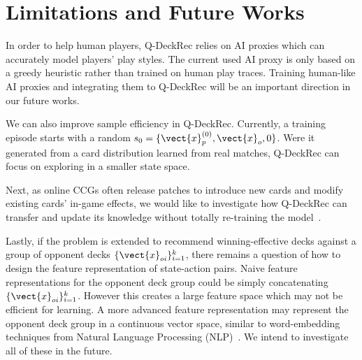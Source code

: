 \section{Limitations and Future Works}\label{sec:limitations}
In order to help human players, Q-DeckRec relies on AI proxies which can accurately model players' play styles. The current used AI proxy is only based on a greedy heuristic rather than trained on human play traces. Training human-like AI proxies and integrating them to Q-DeckRec will be an important direction in our future works.

We can also improve sample efficiency in Q-DeckRec. Currently, a training episode starts with a random $s_0 = \{\vect{x}_p^{(0)}, \vect{x}_o, 0\}$. Were it generated from a card distribution learned from real matches, Q-DeckRec can focus on exploring in a smaller state space.

Next, as online CCGs often release patches to introduce new cards and modify existing cards' in-game effects, we would like to investigate how Q-DeckRec can transfer and update its knowledge without totally re-training the model~\cite{taylor2009transfer}.

Lastly, if the problem is extended to recommend winning-effective decks against a group of opponent decks $\{\vect{x}_{oi}\}^k_{i=1}$, there remains a question of how to design the feature representation of state-action pairs. Naive feature representations for the opponent deck group could be simply concatenating $\{\vect{x}_{oi}\}^k_{i=1}$. However this creates a large feature space which may not be efficient for learning. A more advanced feature representation may represent the opponent deck group in a continuous vector space, similar to word-embedding techniques from Natural Language Processing (NLP)~\cite{mikolov2013distributed}. We intend to investigate all of these in the future.




